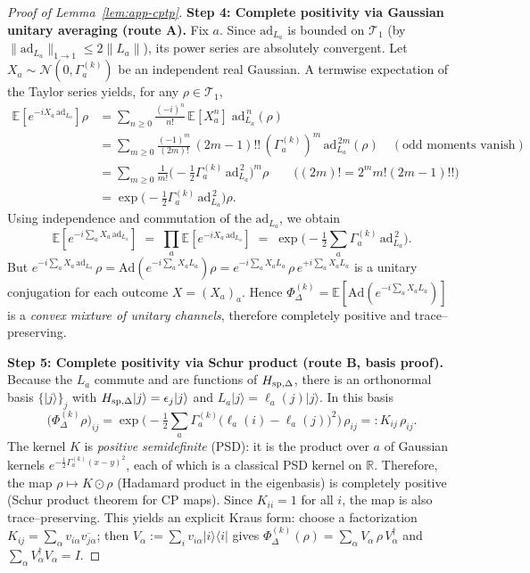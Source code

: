 \documentclass[10pt]{article}
\theoremstyle{definition}
\theoremstyle{plain}
\begin{document}
\begin{proof}[Proof of Lemma~\ref{lem:app-cptp}]
\medskip
\noindent\textbf{Step 4: Complete positivity via Gaussian unitary averaging (route A).}
Fix \(a\). Since \(\mathrm{ad}_{L_a}\) is bounded on \(\mathcal T_1\) (by \(\|\mathrm{ad}_{L_a}\|_{1\to 1}\le 2\|L_a\|\)),
its power series are absolutely convergent. Let \(X_a\sim\mathcal N(0,\Gamma_a^{(k)})\) be an independent real Gaussian.
A termwise expectation of the Taylor series yields, for any \(\rho\in\mathcal T_1\),
\begin{align*}
\mathbb E\!\left[e^{-iX_a\,\mathrm{ad}_{L_a}}\right]\rho
&= \sum_{n\ge 0}\frac{(-i)^n}{n!}\,\mathbb E[X_a^n]\;\mathrm{ad}_{L_a}^{\,n}(\rho)\\
&= \sum_{m\ge 0}\frac{(-1)^m}{(2m)!}\,(2m{-}1)!!\,(\Gamma_a^{(k)})^m\,\mathrm{ad}_{L_a}^{\,2m}(\rho)
\quad(\text{odd moments vanish})\\
&= \sum_{m\ge 0}\frac{1}{m!}\Big(-\tfrac12\Gamma_a^{(k)}\,\mathrm{ad}_{L_a}^{\,2}\Big)^{\!m}\rho
\qquad\big((2m)! = 2^m m!(2m{-}1)!!\big)\\
&= \exp\!\Big(-\tfrac12\Gamma_a^{(k)}\,\mathrm{ad}_{L_a}^{\,2}\Big)\rho.
\end{align*}
Using independence and commutation of the \(\mathrm{ad}_{L_a}\), we obtain
\[
\mathbb E\!\left[e^{-i\sum_a X_a\,\mathrm{ad}_{L_a}}\right]
\;=\; \prod_a \mathbb E\!\left[e^{-iX_a\,\mathrm{ad}_{L_a}}\right]
\;=\;\exp\!\Big(-\tfrac12\sum_a \Gamma_a^{(k)}\,\mathrm{ad}_{L_a}^{\,2}\Big).
\]
But \(e^{-i\sum_a X_a\,\mathrm{ad}_{L_a}}\,\rho
=\mathrm{Ad}\!\left(e^{-i\sum_a X_a L_a}\right)\rho
= e^{-i\sum_a X_a L_a}\,\rho\,e^{+i\sum_a X_a L_a}\) is a unitary conjugation for each outcome \(X=(X_a)_a\).
Hence \(\Phi_\Delta^{(k)}=\mathbb E[\mathrm{Ad}(e^{-i\sum_a X_a L_a})]\) is a \emph{convex mixture of unitary channels},
therefore completely positive and trace–preserving.

\medskip
\noindent\textbf{Step 5: Complete positivity via Schur product (route B, basis proof).}
Because the \(L_a\) commute and are functions of \(H_{{\rm sp},\Delta}\), there is an orthonormal basis
\(\{|j\rangle\}_j\) with
\(H_{{\rm sp},\Delta}|j\rangle=\epsilon_j|j\rangle\) and \(L_a|j\rangle=\ell_a(j)|j\rangle\).
In this basis
\[
\big(\Phi_\Delta^{(k)}\rho\big)_{ij}
=\exp\!\Big(-\tfrac12\sum_a \Gamma_a^{(k)}\big(\ell_a(i)-\ell_a(j)\big)^2\Big)\,\rho_{ij}
=:K_{ij}\,\rho_{ij}.
\]
The kernel \(K\) is \emph{positive semidefinite} (PSD): it is the product over \(a\) of Gaussian kernels
\(e^{-\frac12\Gamma_a^{(k)}(x-y)^2}\), each of which is a classical PSD kernel on \(\mathbb R\). 
Therefore, the map \(\rho\mapsto K\odot \rho\) (Hadamard product in the eigenbasis) is completely positive
(Schur product theorem for CP maps). Since \(K_{ii}=1\) for all \(i\), the map is also trace–preserving.
This yields an explicit Kraus form: choose a factorization \(K_{ij}=\sum_\alpha v_{i\alpha}\overline{v_{j\alpha}}\);
then \(V_\alpha:=\sum_i v_{i\alpha}|i\rangle\langle i|\) gives
\(\Phi_\Delta^{(k)}(\rho)=\sum_\alpha V_\alpha\,\rho\,V_\alpha^\dagger\) and
\(\sum_\alpha V_\alpha^\dagger V_\alpha=I\).


\end{proof}
\end{document}
